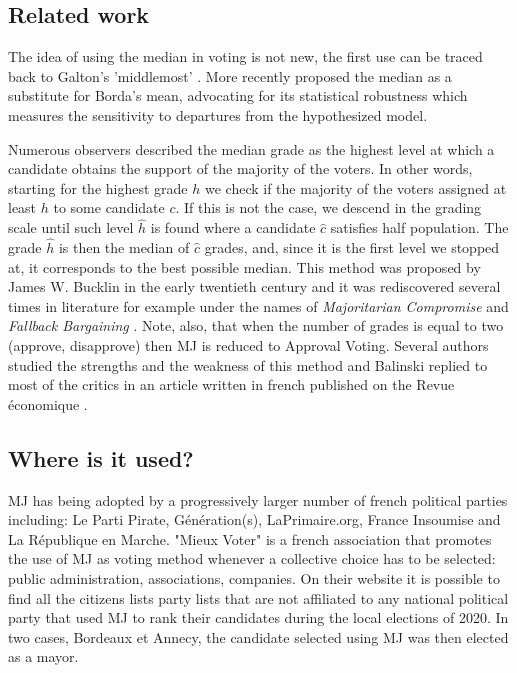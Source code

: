 \documentclass[version=3.21, pagesize, twoside=off, bibliography=totoc, DIV=calc, fontsize=12pt, a4paper]{scrartcl}
\begin{document}
\subsection{Related work}
The idea of using the median in voting is not new, the first use can be traced back to Galton's 'middlemost' \citep{Galton1907a,Galton1907b}. More recently \citet{Bassett1999} proposed the median as a substitute for Borda's mean, advocating for its statistical robustness \textemdash which measures the sensitivity to departures from the hypothesized model.

Numerous observers described the median grade as the highest level at which a candidate obtains the support of the majority of the voters. In other words, starting for the highest grade $h$ we check if the majority of the voters assigned at least $h$ to some candidate $c$. If this is not the case, we descend in the grading scale until such level $\hat{h}$ is found where a candidate $\hat{c}$ satisfies half population. The grade $\hat{h}$ is then the median of $\hat{c}$ grades, and, since it is the first level we stopped at, it corresponds to the best possible median. This method was proposed by James W. Bucklin in the early twentieth century \citep{Hoag1926} and it was rediscovered several times in literature for example under the names of \textit{Majoritarian Compromise} \citep{Sertel1986,Sertel1999} and \textit{Fallback Bargaining} \citep{Brams2001}. Note, also, that when the number of grades is equal to two (approve, disapprove) then \acs{MJ} is reduced to Approval Voting. Several authors studied the strengths and the weakness of this method \citep{Felsenthal2008,Laslier2018} and Balinski replied to most of the critics in an article written in french published on the Revue économique \citep{Balinski2019}.


\subsection{Where is it used?}
\acs{MJ} has being adopted by a progressively larger number of french political parties including: Le Parti Pirate, Génération(s), LaPrimaire.org, France Insoumise and La République en Marche.
"Mieux Voter" \citep{MV} is a french association that promotes the use of \acs{MJ} as voting method whenever a collective choice has to be selected: public administration, associations, companies. On their website it is possible to find all the citizens lists \textendash party lists that are not affiliated to any national political party \textemdash that used \acs{MJ} to rank their candidates during the local elections of 2020. In two cases, Bordeaux et Annecy, the candidate selected using \acs{MJ} was then elected as a mayor. 
\end{document}
